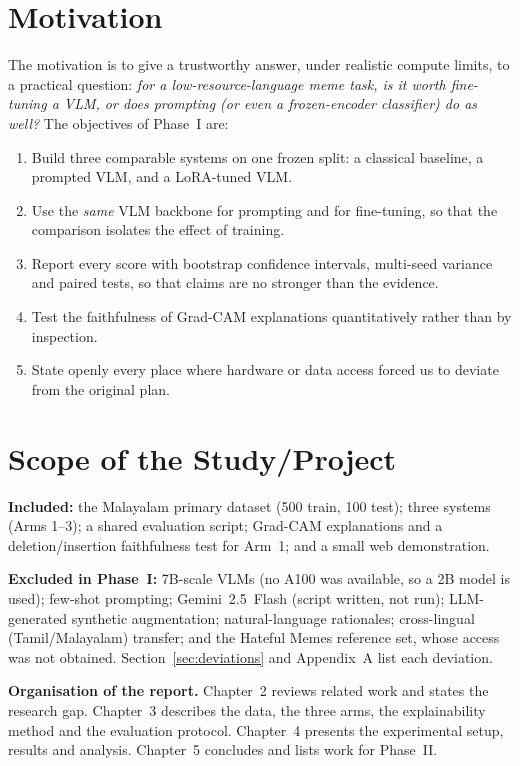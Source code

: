 \section{Motivation}

The motivation is to give a trustworthy answer, under realistic compute limits, to a practical question: \emph{for a low-resource-language meme task, is it worth fine-tuning a VLM, or does prompting (or even a frozen-encoder classifier) do as well?} The objectives of Phase~I are:

\begin{enumerate}
    \item Build three comparable systems on one frozen split: a classical baseline, a prompted VLM, and a LoRA-tuned VLM.
    \item Use the \emph{same} VLM backbone for prompting and for fine-tuning, so that the comparison isolates the effect of training.
    \item Report every score with bootstrap confidence intervals, multi-seed variance and paired tests, so that claims are no stronger than the evidence.
    \item Test the faithfulness of Grad-CAM explanations quantitatively rather than by inspection.
    \item State openly every place where hardware or data access forced us to deviate from the original plan.
\end{enumerate}

\section{Scope of the Study/Project}

\textbf{Included:} the Malayalam primary dataset (500 train, 100 test); three systems (Arms 1--3); a shared evaluation script; Grad-CAM explanations and a deletion/insertion faithfulness test for Arm~1; and a small web demonstration.

\textbf{Excluded in Phase~I:} 7B-scale VLMs (no A100 was available, so a 2B model is used); few-shot prompting; Gemini~2.5~Flash (script written, not run); LLM-generated synthetic augmentation; natural-language rationales; cross-lingual (Tamil/Malayalam) transfer; and the Hateful Memes reference set, whose access was not obtained. Section~\ref{sec:deviations} and Appendix~A list each deviation.

\textbf{Organisation of the report.} Chapter~2 reviews related work and states the research gap. Chapter~3 describes the data, the three arms, the explainability method and the evaluation protocol. Chapter~4 presents the experimental setup, results and analysis. Chapter~5 concludes and lists work for Phase~II.
